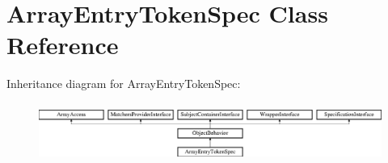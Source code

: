 \section{Array\+Entry\+Token\+Spec Class Reference}
\label{classspec_1_1_prophecy_1_1_argument_1_1_token_1_1_array_entry_token_spec}
Inheritance diagram for Array\+Entry\+Token\+Spec\+:\begin{figure}[H]
\begin{center}
\leavevmode
\includegraphics[height=1.953488cm]{classspec_1_1_prophecy_1_1_argument_1_1_token_1_1_array_entry_token_spec}
\end{center}
\end{figure}
